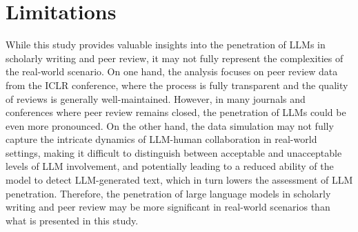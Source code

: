 \section*{Limitations}
While this study provides valuable insights into the penetration of LLMs in scholarly writing and peer review, it may not fully represent the complexities of the real-world scenario. 
On one hand, the analysis focuses on peer review data from the ICLR conference, where the process is fully transparent and the quality of reviews is generally well-maintained. However, in many journals and conferences where peer review remains closed, the penetration of LLMs could be even more pronounced. 
On the other hand, the data simulation may not fully capture the intricate dynamics of LLM-human collaboration in real-world settings, making it difficult to distinguish between acceptable and unacceptable levels of LLM involvement, and potentially leading to a reduced ability of the model to detect LLM-generated text, which in turn lowers the assessment of LLM penetration.
Therefore, the penetration of large language models in scholarly writing and peer review may be more significant in real-world scenarios than what is presented in this study.